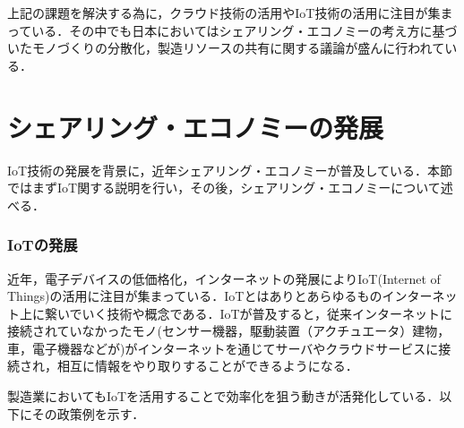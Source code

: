 上記の課題を解決する為に，クラウド技術の活用やIoT技術の活用に注目が集まっている．その中でも日本においてはシェアリング・エコノミーの考え方に基づいたモノづくりの分散化，製造リソースの共有に関する議論が盛んに行われている\cite{IVI}．

\hypertarget{ux30b7ux30a7ux30a2ux30eaux30f3ux30b0ux30a8ux30b3ux30ceux30dfux30fcux306eux767aux5c55}{%
\section{シェアリング・エコノミーの発展}\label{ux30b7ux30a7ux30a2ux30eaux30f3ux30b0ux30a8ux30b3ux30ceux30dfux30fcux306eux767aux5c55}}

IoT技術の発展を背景に，近年シェアリング・エコノミーが普及している．本節ではまずIoT関する説明を行い，その後，シェアリング・エコノミーについて述べる．

\hypertarget{iotux306eux767aux5c55}{%
\subsubsection{IoTの発展}\label{iotux306eux767aux5c55}}

近年，電子デバイスの低価格化，インターネットの発展によりIoT(Internet of
Things)の活用に注目が集まっている．IoTとはありとあらゆるものインターネット上に繋いでいく技術や概念である\cite{IoT2009}．IoTが普及すると，従来インターネットに接続されていなかったモノ(センサー機器，駆動装置（アクチュエータ）建物，車，電子機器などが)がインターネットを通じてサーバやクラウドサービスに接続され，相互に情報をやり取りすることができるようになる\cite{AWS-IoT}．

製造業においてもIoTを活用することで効率化を狙う動きが活発化している．以下にその政策例を示す．

